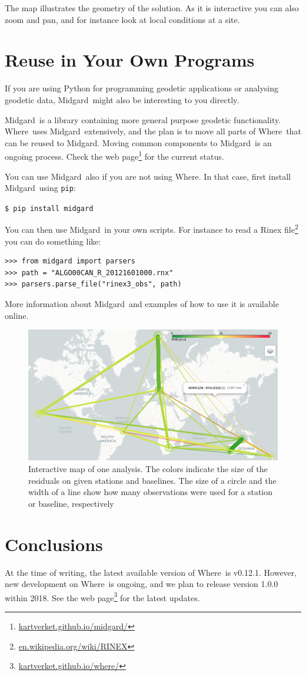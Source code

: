 \documentclass[twocolumn,twoside]{svmultivs_gm} %
\newcommand{\code}[1]{{\footnotesize\texttt{#1}}}
\newcommand{\where}{\textsf{Where}}
\newcommand{\midgard}{\textsf{Midgard}}
\begin{document}
The map illustrates the geometry of the solution. As it is interactive you can also zoom and pan, and for instance look at local conditions at a site.
%
\section{Reuse in Your Own Programs}
\label{sec:midgard}
%
If you are using Python for programming geodetic applications or analysing geodetic data, \midgard\ might also be interesting to you directly.

\midgard\ is a library containing more general purpose geodetic functionality. \where\ uses \midgard\ extensively, and the plan is to move all parts of \where\ that can be reused to \midgard. Moving common components to \midgard\ is an ongoing process. Check the web page\footnote{\url{kartverket.github.io/midgard/}} for the current status.

You can use \midgard\ also if you are not using \where. In that case, first install \midgard\ using \code{pip}:

\code{\$ pip install midgard}

You can then use \midgard\ in your own scripts. For instance to read a Rinex file\footnote{\url{en.wikipedia.org/wiki/RINEX}} you can do something like:

{\footnotesize\begin{verbatim}
>>> from midgard import parsers
>>> path = "ALGO00CAN_R_20121601000.rnx"
>>> parsers.parse_file("rinex3_obs", path)
\end{verbatim}}

More information about \midgard\ and examples of how to use it is available online.

\begin{figure}[t]
  \includegraphics[width=.5\textwidth]{hjelle05.png}
  \caption{Interactive map of one analysis. The colors indicate the size of the residuals on given stations and baselines. The size of a circle and the width of a line show how many observations were used for a station or baseline, respectively}
  \label{fig:map}
\end{figure}
%
\section{Conclusions}
%
At the time of writing, the latest available version of \where\ is v0.12.1. However, new development on \where\ is ongoing, and we plan to release version 1.0.0 within 2018. See the web page\footnote{\url{kartverket.github.io/where/}} for the latest updates.
\end{document}
